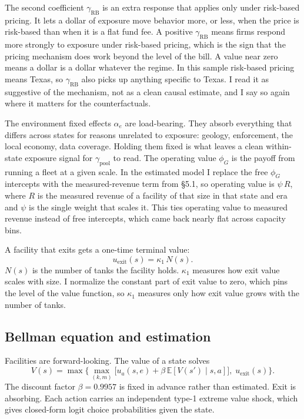 \documentclass[
  12pt,
]{article}
\begin{document}
The second coefficient \(\gamma_{\text{RB}}\) is an extra response that
applies only under risk-based pricing. It lets a dollar of exposure move
behavior more, or less, when the price is risk-based than when it is a
flat fund fee. A positive \(\gamma_{\text{RB}}\) means firms respond
more strongly to exposure under risk-based pricing, which is the sign
that the pricing mechanism does work beyond the level of the bill. A
value near zero means a dollar is a dollar whatever the regime. In this
sample risk-based pricing means Texas, so \(\gamma_{\text{RB}}\) also
picks up anything specific to Texas. I read it as suggestive of the
mechanism, not as a clean causal estimate, and I say so again where it
matters for the counterfactuals.

The environment fixed effects \(\alpha_e\) are load-bearing. They absorb
everything that differs across states for reasons unrelated to exposure:
geology, enforcement, the local economy, data coverage. Holding them
fixed is what leaves a clean within-state exposure signal for
\(\gamma_{\text{pool}}\) to read. The operating value \(\phi_G\) is the
payoff from running a fleet at a given scale. In the estimated model I
replace the free \(\phi_G\) intercepts with the measured-revenue term
from §5.1, so operating value is \(\psi\,R\), where \(R\) is the
measured revenue of a facility of that size in that state and era and
\(\psi\) is the single weight that scales it. This ties operating value
to measured revenue instead of free intercepts, which came back nearly
flat across capacity bins.

A facility that exits gets a one-time terminal value: \[
u_{\text{exit}}(s)=\kappa_1\,N(s).
\] \(N(s)\) is the number of tanks the facility holds. \(\kappa_1\)
measures how exit value scales with size. I normalize the constant part
of exit value to zero, which pins the level of the value function, so
\(\kappa_1\) measures only how exit value grows with the number of
tanks.

\subsection{Bellman equation and
estimation}\label{bellman-equation-and-estimation}

Facilities are forward-looking. The value of a state solves \[
V(s)=\max\Big\{\max_{(k,m)}\big[u_a(s,e)+\beta\,\mathbb E[V(s')\mid s,a]\big],\;u_{\text{exit}}(s)\Big\}.
\] The discount factor \(\beta=0.9957\) is fixed in advance rather than
estimated. Exit is absorbing. Each action carries an independent type-1
extreme value shock, which gives closed-form logit choice probabilities
given the state.
\end{document}

